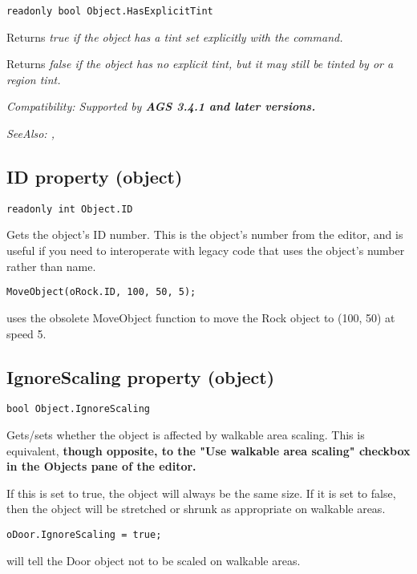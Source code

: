 \begin{verbatim}
readonly bool Object.HasExplicitTint
\end{verbatim}
Returns \it{true} if the object has a tint set explicitly with the
 command.

Returns \it{false} if the object has no explicit tint, but it may still be
tinted by  or a region tint.

\it{Compatibility:} Supported by \bf{AGS 3.4.1} and later versions.

\it{SeeAlso:} ,


\subsection{ID property (object)}\label{Object.ID}%

\begin{verbatim}
readonly int Object.ID
\end{verbatim}
Gets the object's ID number. This is the object's number from the editor, and is
useful if you need to interoperate with legacy code that uses the object's number
rather than name.

\begin{verbatim}
MoveObject(oRock.ID, 100, 50, 5);
\end{verbatim}
uses the obsolete MoveObject function to move the Rock object to (100, 50) at speed 5.


\subsection{IgnoreScaling property (object)}\label{Object.IgnoreScaling}%

\begin{verbatim}
bool Object.IgnoreScaling
\end{verbatim}
Gets/sets whether the object is affected by walkable area scaling. This is equivalent,
\bf{though opposite}, to the "Use walkable area scaling" checkbox in the Objects pane of the editor.

If this is set to true, the object will always be the same size. If it is set to false, then
the object will be stretched or shrunk as appropriate on walkable areas.

\begin{verbatim}
oDoor.IgnoreScaling = true;
\end{verbatim}
will tell the Door object not to be scaled on walkable areas.

